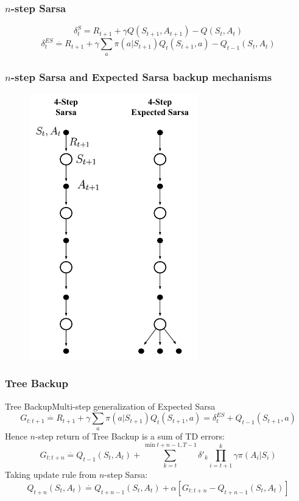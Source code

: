 \documentclass{beamer}
\begin{document}
\begin{frame}
  \frametitle{$n$-step Sarsa}
  $$\delta^{S}_t = R_{t + 1} + \gamma Q(S_{t + 1}, A_{t + 1}) - Q(S_t, A_t)$$
  $$\delta^{ES}_t \overset{\cdot}{=} R_{t + 1} +
    \gamma \sum_{a} \pi(a | S_{t + 1}) Q_t(S_{t + 1}, a) - Q_{t - 1}(S_t, A_t)$$
\end{frame}

\begin{frame}
  \frametitle{$n$-step Sarsa and Expected Sarsa backup mechanisms}
  \begin{figure}
    \centering
    \includegraphics[height=0.7 \textheight]{sarsa-backup}
  \end{figure}
\end{frame}

\begin{frame}
  \frametitle{Tree Backup}
  Tree BackupMulti-step generalization of Expected Sarsa
  $$G_{t : t + 1} \overset{\cdot}{=} R_{t + 1} +
    \gamma \sum_{a} \pi(a | S_{t + 1}) Q_t(S_{t + 1}, a) = \delta^{ES}_t
    + Q_{t - 1}(S_{t + 1}, a)$$
  Hence $n$-step return of Tree Backup is a sum of TD errors:
  $$G_{t : t + n} \overset{\cdot}{=} Q_{t -1}(S_t, A_t) +
    \sum_{k = t}^{\min{t + n - 1, T - 1}} \delta'_k \prod_{i = t + 1}^k \gamma
    \pi(A_i | S_i)$$
  Taking update rule from $n$-step Sarsa:
  $$Q_{t + n}(S_t, A_t) \overset{\cdot}{=} Q_{t + n - 1}(S_t, A_t) +
    \alpha[G_{t : t + n} - Q_{t + n -1}(S_t, A_t)]$$
\end{frame}
\end{document}
